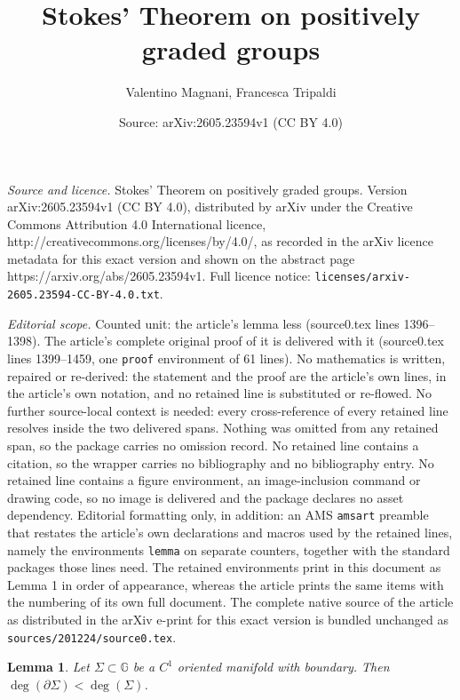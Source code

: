 \documentclass[10pt,a4paper]{amsart}
\title{Stokes' Theorem on positively graded groups}
\author{Valentino Magnani, Francesca Tripaldi}
\date{Source: arXiv:2605.23594v1 (CC BY 4.0)}
\newtheorem{lemma}{Lemma}
\newcommand{\G}{\mathbb{G}}
\begin{document}
\maketitle

\noindent\emph{Source and licence.} Stokes' Theorem on positively graded groups. Version arXiv:2605.23594v1 (CC BY 4.0), distributed by arXiv under the Creative Commons Attribution 4.0 International licence, http://creativecommons.org/licenses/by/4.0/, as recorded in the arXiv licence metadata for this exact version and shown on the abstract page https://arxiv.org/abs/2605.23594v1. Full licence notice: \texttt{licenses/arxiv-2605.23594-CC-BY-4.0.txt}.\par\smallskip

\noindent\textit{Editorial scope.} Counted unit: the article's lemma less (source0.tex lines 1396--1398). The article's complete original proof of it is delivered with it (source0.tex lines 1399--1459, one \texttt{proof} environment of 61 lines). No mathematics is written, repaired or re-derived: the statement and the proof are the article's own lines, in the article's own notation, and no retained line is substituted or re-flowed.  No further source-local context is needed: every cross-reference of every retained line resolves inside the two delivered spans.  Nothing was omitted from any retained span, so the package carries no omission record.  No retained line contains a citation, so the wrapper carries no bibliography and no bibliography entry.  No retained line contains a figure environment, an image-inclusion command or drawing code, so no image is delivered and the package declares no asset dependency.  Editorial formatting only, in addition: an AMS \texttt{amsart} preamble that restates the article's own declarations and macros used by the retained lines, namely the environments \texttt{lemma} on separate counters, together with the standard packages those lines need.  The retained environments print in this document as Lemma 1 in order of appearance, whereas the article prints the same items with the numbering of its own full document.  The complete native source of the article as distributed in the arXiv e-print for this exact version is bundled unchanged as \texttt{sources/201224/source0.tex}.
\begin{lemma}\label{lem: deg boundary less}
Let $\Sigma\subset\G$ be a $C^1$ oriented manifold with boundary.  Then $\deg(\partial \Sigma)<\deg(\Sigma)$.
\end{lemma}
\end{document}
